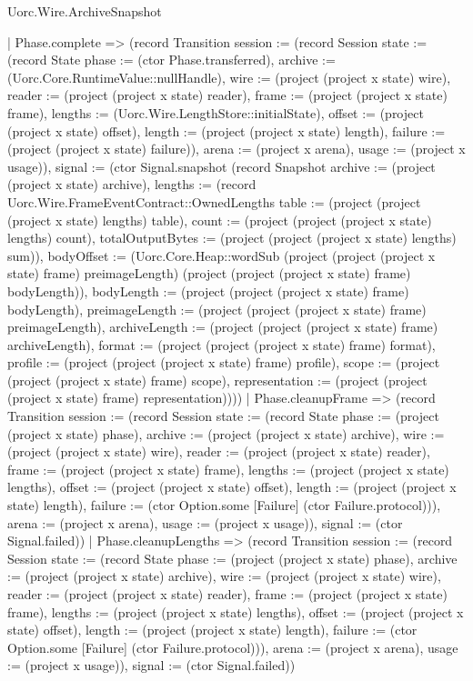 \begin{lexlean}{Uorc.Wire.ArchiveSnapshot}
\begin{semanticmodule}
{    | Phase.complete => (record Transition {session := (record Session {state := (record State {phase := (ctor Phase.transferred), archive := (Uorc.Core.RuntimeValue::nullHandle), wire := (project (project x state) wire), reader := (project (project x state) reader), frame := (project (project x state) frame), lengths := (Uorc.Wire.LengthStore::initialState), offset := (project (project x state) offset), length := (project (project x state) length), failure := (project (project x state) failure)}), arena := (project x arena), usage := (project x usage)}), signal := (ctor Signal.snapshot (record Snapshot {archive := (project (project x state) archive), lengths := (record Uorc.Wire.FrameEventContract::OwnedLengths {table := (project (project (project x state) lengths) table), count := (project (project (project x state) lengths) count), totalOutputBytes := (project (project (project x state) lengths) sum)}), bodyOffset := (Uorc.Core.Heap::wordSub (project (project (project x state) frame) preimageLength) (project (project (project x state) frame) bodyLength)), bodyLength := (project (project (project x state) frame) bodyLength), preimageLength := (project (project (project x state) frame) preimageLength), archiveLength := (project (project (project x state) frame) archiveLength), format := (project (project (project x state) frame) format), profile := (project (project (project x state) frame) profile), scope := (project (project (project x state) frame) scope), representation := (project (project (project x state) frame) representation)}))})
    | Phase.cleanupFrame => (record Transition {session := (record Session {state := (record State {phase := (project (project x state) phase), archive := (project (project x state) archive), wire := (project (project x state) wire), reader := (project (project x state) reader), frame := (project (project x state) frame), lengths := (project (project x state) lengths), offset := (project (project x state) offset), length := (project (project x state) length), failure := (ctor Option.some [Failure] (ctor Failure.protocol))}), arena := (project x arena), usage := (project x usage)}), signal := (ctor Signal.failed)})
    | Phase.cleanupLengths => (record Transition {session := (record Session {state := (record State {phase := (project (project x state) phase), archive := (project (project x state) archive), wire := (project (project x state) wire), reader := (project (project x state) reader), frame := (project (project x state) frame), lengths := (project (project x state) lengths), offset := (project (project x state) offset), length := (project (project x state) length), failure := (ctor Option.some [Failure] (ctor Failure.protocol))}), arena := (project x arena), usage := (project x usage)}), signal := (ctor Signal.failed)})
}
\end{semanticmodule}
\end{lexlean}
